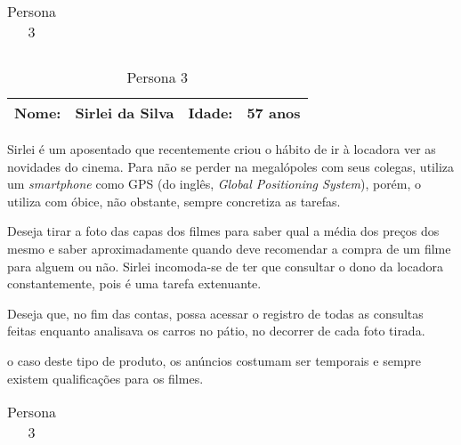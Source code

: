 \FloatBarrier
\par \noindent
\begin{table}[ht]
    \begin{tabularx}{\textwidth}{c}
        \toprule
    \end{tabularx}
    
    \begin{tabularx}{\textwidth}{p{}p{}
                                 p{}p{}}
        \textbf{Nome:} & Sirlei da Silva
        & \textbf{Idade:} & 57 anos \\
    \midrule
    \end{tabularx}
    
    \hspace*{1cm} Sirlei é um aposentado que recentemente criou o hábito de ir
    à locadora ver as novidades do cinema. Para não se perder na  megalópoles com seus 
    colegas, utiliza um \textit{smartphone} como GPS (do inglês,
    \textit{Global Positioning System}), porém, o utiliza com óbice,
    não obstante, sempre concretiza as tarefas.

    \hspace*{1cm} Deseja tirar a foto das capas dos filmes para saber qual 
    a média dos preços dos mesmo e saber aproximadamente quando deve  
    recomendar a compra de um filme para alguem ou não. Sirlei incomoda-se de ter que consultar o dono da locadora
    constantemente, pois é uma tarefa extenuante. 
    
    \hspace*{1cm} Deseja que, no fim das contas, possa acessar o registro 
    de todas as consultas feitas enquanto analisava os carros no pátio, 
    no decorrer de cada foto tirada.

    \hspace*{1cm} o caso deste tipo de produto, os anúncios costumam ser 
    temporais e  sempre existem qualificações para os filmes.

    \begin{tabularx}{\textwidth}{c}
        \bottomrule
    \end{tabularx}
    
    \caption{ \label{Persona3} Persona 3}
\end{table}

